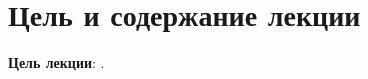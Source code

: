 ﻿%
\section*{Цель и содержание лекции}
\begin{frame}

\textbf{Цель лекции}: \GoalOfResearch.

\setcounter{tocdepth}{1}
\tableofcontents
\setcounter{tocdepth}{2}

\end{frame}
